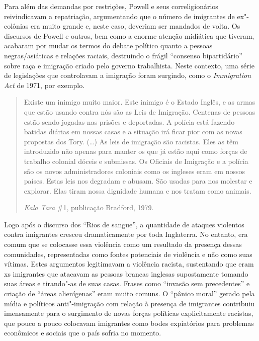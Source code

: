 Para além das demandas por restrições, Powell e seus correligionários reivindicavam a repatriação, argumentando que o número de imigrantes de ex"-colônias era muito grande e, neste caso, deveriam ser mandados de volta. Os discursos de Powell e outros, bem como a enorme atenção midiática que tiveram, acabaram por mudar os termos do debate político quanto a pessoas negras/asiáticas e relações raciais, destruindo o frágil ``consenso bipartidário'' sobre raça e imigração criado pelo governo trabalhista. Neste contexto, uma série de legislações que controlavam a imigração foram surgindo, como o \emph{Immigration Act} de 1971, por exemplo.

\begin{quote}
Existe um inimigo muito maior. Este inimigo é o Estado Inglês, e as armas que estão usando contra nós são as Leis de Imigração. Centenas de pessoas estão sendo jogadas nas prisões e deportadas. A polícia está fazendo batidas diárias em nossas casas e a situação irá ficar pior com as novas propostas dos Tory. (\ldots{}) As leis de imigração são racistas. Eles as têm introduzido não apenas para manter os que já estão aqui como forças de trabalho colonial dóceis e submissas. Os Oficiais de Imigração e a polícia são os novos administradores coloniais como os ingleses eram em nossos países. Estas leis nos degradam e abusam. São usadas para nos molestar e explorar. Elas tiram nossa dignidade humana e nos tratam como animais.

\emph{Kala Tara} \#1, publicação  Bradford, 1979.
\end{quote}

Logo após o discurso dos ``Rios de sangue'', a quantidade de ataques violentos contra imigrantes cresceu dramaticamente por toda Inglaterra. No entanto, era comum que se colocasse essa violência como um resultado da presença dessas comunidades, representadas como fontes potenciais de violência e não como suas vítimas. Estes argumentos legitimavam a violência racista, sustentando que eram xs imigrantes que atacavam as pessoas brancas inglesas supostamente tomando suas áreas e tirando"-as de suas casas. Frases como ``invasão sem precedentes'' e criação de ``áreas alienígenas'' eram muito comuns. O ``pânico moral'' gerado pela mídia e políticos anti"-imigração com relação à presença de imigrantes contribuiu imensamente para o surgimento de novas forças políticas explicitamente racistas, que pouco a pouco colocavam imigrantes como bodes expiatórios para problemas econômicos e sociais que o país sofria no momento.

